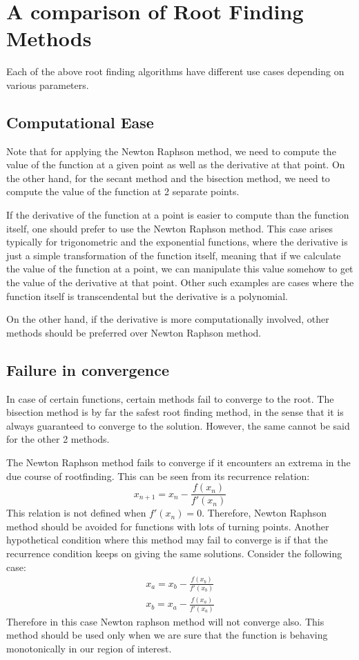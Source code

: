\documentclass[12,a4paper]{article}
\begin{document}
    \section{A comparison of Root Finding Methods}
    Each of the above root finding algorithms have different use cases depending on various parameters. 
    \subsection{Computational Ease}
    Note that for applying the Newton Raphson method, we need to compute the value of the function at a given point as well as the derivative at that point. On the other hand, for the secant method and the bisection method, we need to compute the value of the function at 2 separate points. 
    
    If the derivative of the function at a point is easier to compute than the function itself, one should prefer to use the Newton Raphson method. This case arises typically for trigonometric and the exponential functions, where the derivative is just a simple transformation of the function itself, meaning that if we calculate the value of the function at a point, we can manipulate this value somehow to get the value of the derivative at that point. Other such examples are cases where the function itself is transcendental but the derivative is a polynomial.
    
    On the other hand, if the derivative is more computationally involved, other methods should be preferred over Newton Raphson method.
    \subsection{Failure in convergence}
    In case of certain functions, certain methods fail to converge to the root. The bisection method is by far the safest root finding method, in the sense that it is always guaranteed to converge to the solution. However, the same cannot be said for the other 2 methods.
    
    The Newton Raphson method fails to converge if it encounters an extrema in the due course of rootfinding. This can be seen from its recurrence relation:
    \begin{equation}
        x_{n+1} = x_n - \frac{f(x_n)}{f'(x_n)}
    \end{equation}
    This relation is not defined when $f'(x_n)=0$. Therefore, Newton Raphson method should be avoided for functions with lots of turning points. Another hypothetical condition where this method may fail to converge is if that the recurrence condition keeps on giving the same solutions. Consider the following case:
    \begin{eqnarray}
        x_a = x_b - \frac{f(x_b)}{f'(x_b)}\nonumber\\
        x_b = x_a - \frac{f(x_a)}{f'(x_a)}\nonumber
    \end{eqnarray}
    Therefore in this case Newton raphson method will not converge also. This method should be used only when we are sure that the function is behaving monotonically in our region of interest.
    
\end{document}

